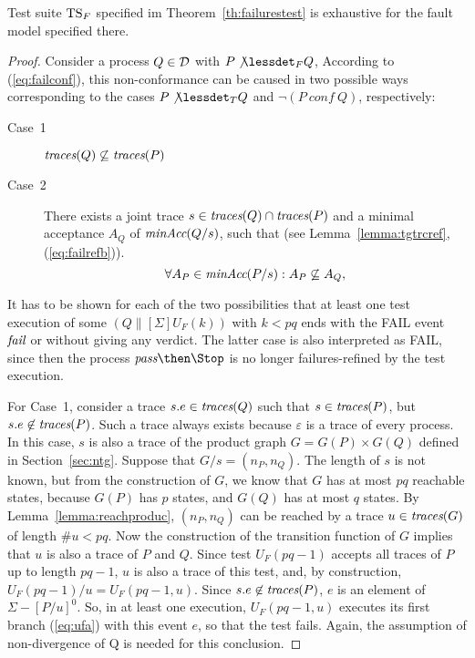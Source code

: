 \begin{lemma}\label{lemma:mainfexhaustive}
Test suite ${\text{TS}}_F$ specified im Theorem~\ref{th:failurestest} is exhaustive for the fault
model specified there.
\end{lemma}
\begin{proof}
Consider a process $Q\in{\cal D}$ with
$P\not\lessdet_F Q$, According to (\ref{eq:failconf}),  
this non-conformance can be caused in two possible ways corresponding to the cases $P\not\lessdet_T Q$ and 
$\neg(P\ conf\ Q)$, respectively:
\begin{description}
\item[Case~1] $\text{\it traces}(Q)\not\subseteq \text{\it traces}(P)$
\item[Case~2] There exists a joint trace $s\in\text{\it traces}(Q)\cap\text{\it traces}(P)$ and a minimal acceptance $A_Q$
of $\text{\it minAcc}(Q/s)$, such that
(see Lemma~\ref{lemma:tgtrcref}, (\ref{eq:failrefb})).
\begin{equation}
\label{eq:accsnotcontained}
\forall A_P\in\text{\it minAcc}(P/s): A_P\not\subseteq A_Q,
\end{equation}
\end{description}
It has to be shown for each of the two possibilities that at least one test
execution of some $(Q\parallel[\Sigma] U_F(k))$ with $k < pq$ ends with the
FAIL event ${\text{\it fail}}$ or without giving any verdict. The latter case is also
interpreted  as FAIL, since then the process $\epass\then\Stop$ is no longer
failures-refined by the test execution.

For Case~1, consider a  trace $s.e\in\text{\it traces}(Q)$ such that $s\in\text{\it traces}(P)$, but
$s.e\not\in\text{\it traces}(P)$. Such a trace always exists because $\varepsilon$ is a
trace of every process. In this case, $s$ is also a trace of the product
graph $G = G(P)\times G(Q)$ defined in Section~\ref{sec:ntg}. Suppose that
$G/s = (n_P,n_Q)$. The length of $s$ is not known, but from the construction
of $G$,  we know that $G$ has at most $pq$ reachable states, because $G(P)$
has $p$ states, and $G(Q)$ has at most $q$ states. By
Lemma~\ref{lemma:reachproduc}, $(n_P,n_Q)$ can be reached by a trace
$u\in\text{\it traces}(G)$ of length $\#u < pq$. Now the construction of the transition
function of $G$ implies that $u$ is also a trace of $P$ and $Q$. Since test
$U_F(pq-1)$ accepts all traces of $P$ up to length $pq-1$, $u$ is also a
trace of this test, and, by construction, $U_F(pq-1)/u = U_F(pq-1,u)$. Since
$s.e\not\in\text{\it traces}(P)$, $e$ is an element of $\Sigma-[P/u]^0$. So, in at least
one execution, $U_F(pq-1,u)$ executes its first branch (\ref{eq:ufa}) with
this event $e$, so that the test fails. Again, the
assumption of non-divergence of Q is needed for this conclusion. %


\end{proof}
